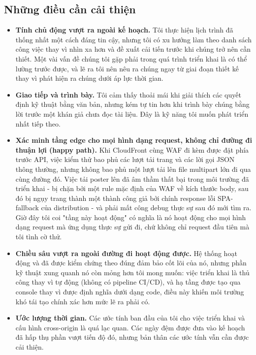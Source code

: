 \documentclass[a4paper,12pt]{article}
\begin{document}
\subsection{Những điều cần cải thiện}

\begin{itemize}
    \item \textbf{Tính chủ động vượt ra ngoài kế hoạch.} Tôi thực hiện lịch trình đã thống nhất một cách đáng tin cậy, nhưng tôi có xu hướng làm theo danh sách công việc thay vì nhìn xa hơn và đề xuất cải tiến trước khi chúng trở nên cần thiết. Một vài vấn đề chúng tôi gặp phải trong quá trình triển khai là có thể lường trước được, và lẽ ra tôi nên nêu ra chúng ngay từ giai đoạn thiết kế thay vì phát hiện ra chúng dưới áp lực thời gian.
    \item \textbf{Giao tiếp và trình bày.} Tôi cảm thấy thoải mái khi giải thích các quyết định kỹ thuật bằng văn bản, nhưng kém tự tin hơn khi trình bày chúng bằng lời trước một khán giả chưa đọc tài liệu. Đây là kỹ năng tôi muốn phát triển nhất tiếp theo.
    \item \textbf{Xác minh tầng edge cho mọi hình dạng request, không chỉ đường đi thuận lợi (happy path).} Khi CloudFront cùng WAF đi kèm được đặt phía trước API, việc kiểm thử bao phủ các lượt tải trang và các lời gọi JSON thông thường, nhưng không bao phủ một lượt tải lên file multipart lớn đi qua cùng đường đó. Việc tải poster lên đã âm thầm thất bại trong môi trường đã triển khai - bị chặn bởi một rule mặc định của WAF về kích thước body, sau đó bị ngụy trang thành một thành công giả bởi chính response lỗi SPA-fallback của distribution - và phải mất công debug thực sự sau đó mới tìm ra. Giờ đây tôi coi "tầng này hoạt động" có nghĩa là nó hoạt động cho mọi hình dạng request mà ứng dụng thực sự gửi đi, chứ không chỉ request đầu tiên mà tôi tình cờ thử.
    \item \textbf{Chiều sâu vượt ra ngoài đường đi hoạt động được.} Hệ thống hoạt động và đã được kiểm chứng theo đúng đảm bảo cốt lõi của nó, nhưng phần kỹ thuật xung quanh nó còn mỏng hơn tôi mong muốn: việc triển khai là thủ công thay vì tự động (không có pipeline CI/CD), và hạ tầng được tạo qua console thay vì được định nghĩa dưới dạng code, điều này khiến môi trường khó tái tạo chính xác hơn mức lẽ ra phải có.
    \item \textbf{Ước lượng thời gian.} Các ước tính ban đầu của tôi cho việc triển khai và cấu hình cross-origin là quá lạc quan. Các ngày đệm được đưa vào kế hoạch đã hấp thụ phần vượt tiến độ đó, nhưng bản thân các ước tính vẫn cần được cải thiện.
\end{itemize}
\end{document}
